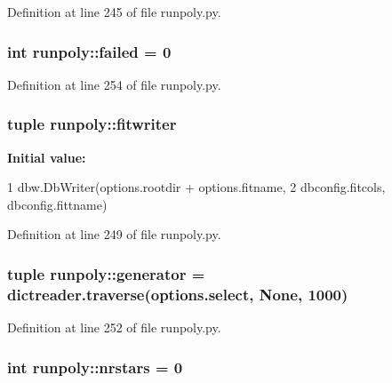 Definition at line 245 of file runpoly.py.

\hypertarget{namespacerunpoly_a77eea5c10faa8e40af7173ac7eda3478}{
\subsubsection[{failed}]{\setlength{\rightskip}{0pt plus 5cm}int {\bf runpoly::failed} = 0}}
\label{namespacerunpoly_a77eea5c10faa8e40af7173ac7eda3478}


Definition at line 254 of file runpoly.py.

\hypertarget{namespacerunpoly_a270c35c20bdd6aa659cab1358e8f9475}{
\subsubsection[{fitwriter}]{\setlength{\rightskip}{0pt plus 5cm}tuple {\bf runpoly::fitwriter}}}
\label{namespacerunpoly_a270c35c20bdd6aa659cab1358e8f9475}
{\bfseries Initial value:}
\begin{DoxyCode}
1 dbw.DbWriter(options.rootdir + options.fitname, 
2                               dbconfig.fitcols, dbconfig.fittname)
\end{DoxyCode}


Definition at line 249 of file runpoly.py.

\hypertarget{namespacerunpoly_a66f644ff5f02e8d9724a514873ac1be4}{
\subsubsection[{generator}]{\setlength{\rightskip}{0pt plus 5cm}tuple {\bf runpoly::generator} = dictreader.traverse(options.select, None, 1000)}}
\label{namespacerunpoly_a66f644ff5f02e8d9724a514873ac1be4}


Definition at line 252 of file runpoly.py.

\hypertarget{namespacerunpoly_aa86a45877f78f52e3357c19a9221feed}{
\subsubsection[{nrstars}]{\setlength{\rightskip}{0pt plus 5cm}int {\bf runpoly::nrstars} = 0}}
\label{namespacerunpoly_aa86a45877f78f52e3357c19a9221feed}


